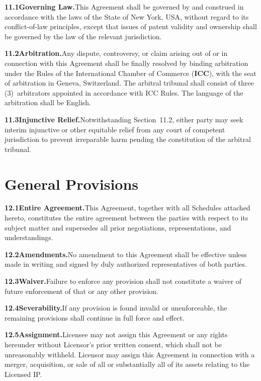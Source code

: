 \documentclass[11pt,a4paper]{article}
\begin{document}
\textbf{11.1\enspace Governing Law.}\enspace This Agreement shall be governed by and
construed in accordance with the laws of the State of New York, USA, without regard to its
conflict-of-law principles, except that issues of patent validity and ownership shall be
governed by the law of the relevant jurisdiction.

\textbf{11.2\enspace Arbitration.}\enspace Any dispute, controversy, or claim arising out of
or in connection with this Agreement shall be finally resolved by binding arbitration under
the Rules of the International Chamber of Commerce (\textbf{ICC}), with the seat of arbitration
in Geneva, Switzerland. The arbitral tribunal shall consist of three (3)~arbitrators appointed
in accordance with ICC Rules. The language of the arbitration shall be English.

\textbf{11.3\enspace Injunctive Relief.}\enspace Notwithstanding Section~11.2, either party
may seek interim injunctive or other equitable relief from any court of competent jurisdiction
to prevent irreparable harm pending the constitution of the arbitral tribunal.

\section{General Provisions}

\textbf{12.1\enspace Entire Agreement.}\enspace This Agreement, together with all Schedules
attached hereto, constitutes the entire agreement between the parties with respect to its
subject matter and supersedes all prior negotiations, representations, and understandings.

\textbf{12.2\enspace Amendments.}\enspace No amendment to this Agreement shall be effective
unless made in writing and signed by duly authorized representatives of both parties.

\textbf{12.3\enspace Waiver.}\enspace Failure to enforce any provision shall not constitute a
waiver of future enforcement of that or any other provision.

\textbf{12.4\enspace Severability.}\enspace If any provision is found invalid or unenforceable,
the remaining provisions shall continue in full force and effect.

\textbf{12.5\enspace Assignment.}\enspace Licensee may not assign this Agreement or any rights
hereunder without Licensor's prior written consent, which shall not be unreasonably withheld.
Licensor may assign this Agreement in connection with a merger, acquisition, or sale of all or
substantially all of its assets relating to the Licensed IP.
\end{document}
